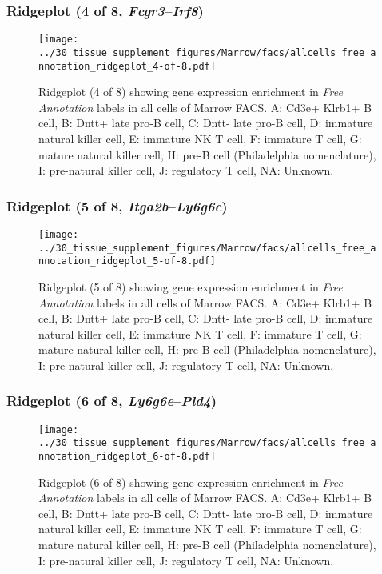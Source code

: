\clearpage

\subsubsection{Ridgeplot (4 of 8, \emph{Fcgr3}--\emph{Irf8})}
\begin{figure}[h]
\centering
\texttt{[image: ../30\_tissue\_supplement\_figures/Marrow/facs/allcells\_free\_annotation\_ridgeplot\_4-of-8.pdf]}

\caption{ Ridgeplot (4 of 8)  showing gene expression enrichment in \emph{Free Annotation} labels in all cells of Marrow FACS. A: Cd3e+ Klrb1+ B cell, B: Dntt+ late pro-B cell, C: Dntt- late pro-B cell, D: immature natural killer cell, E: immature NK T cell, F: immature T cell, G: mature natural killer cell, H: pre-B cell (Philadelphia nomenclature), I: pre-natural killer cell, J: regulatory T cell, NA: Unknown.}
\end{figure}


\clearpage

\subsubsection{Ridgeplot (5 of 8, \emph{Itga2b}--\emph{Ly6g6c})}
\begin{figure}[h]
\centering
\texttt{[image: ../30\_tissue\_supplement\_figures/Marrow/facs/allcells\_free\_annotation\_ridgeplot\_5-of-8.pdf]}

\caption{ Ridgeplot (5 of 8)  showing gene expression enrichment in \emph{Free Annotation} labels in all cells of Marrow FACS. A: Cd3e+ Klrb1+ B cell, B: Dntt+ late pro-B cell, C: Dntt- late pro-B cell, D: immature natural killer cell, E: immature NK T cell, F: immature T cell, G: mature natural killer cell, H: pre-B cell (Philadelphia nomenclature), I: pre-natural killer cell, J: regulatory T cell, NA: Unknown.}
\end{figure}


\clearpage

\subsubsection{Ridgeplot (6 of 8, \emph{Ly6g6e}--\emph{Pld4})}
\begin{figure}[h]
\centering
\texttt{[image: ../30\_tissue\_supplement\_figures/Marrow/facs/allcells\_free\_annotation\_ridgeplot\_6-of-8.pdf]}

\caption{ Ridgeplot (6 of 8)  showing gene expression enrichment in \emph{Free Annotation} labels in all cells of Marrow FACS. A: Cd3e+ Klrb1+ B cell, B: Dntt+ late pro-B cell, C: Dntt- late pro-B cell, D: immature natural killer cell, E: immature NK T cell, F: immature T cell, G: mature natural killer cell, H: pre-B cell (Philadelphia nomenclature), I: pre-natural killer cell, J: regulatory T cell, NA: Unknown.}
\end{figure}


